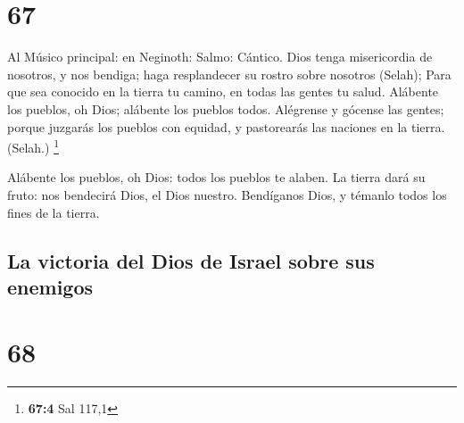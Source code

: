 \hypertarget{section-66}{%
\section{67}\label{section-66}}

 Al Músico principal: en Neginoth: Salmo: Cántico. Dios
tenga misericordia de nosotros, y nos bendiga; haga resplandecer su
rostro sobre nosotros (Selah);  Para que sea conocido en la
tierra tu camino, en todas las gentes tu salud.  Alábente
los pueblos, oh Dios; alábente los pueblos todos.  Alégrense
y gócense las gentes; porque juzgarás los pueblos con equidad, y
pastorearás las naciones en la tierra. (Selah.) \footnote{\textbf{67:4}
  Sal 117,1}

 Alábente los pueblos, oh Dios: todos los pueblos te alaben.
 La tierra dará su fruto: nos bendecirá Dios, el Dios
nuestro.  Bendíganos Dios, y témanlo todos los fines de la
tierra.

\hypertarget{la-victoria-del-dios-de-israel-sobre-sus-enemigos}{%
\subsection{La victoria del Dios de Israel sobre sus
enemigos}\label{la-victoria-del-dios-de-israel-sobre-sus-enemigos}}

\hypertarget{section-67}{%
\section{68}\label{section-67}}


